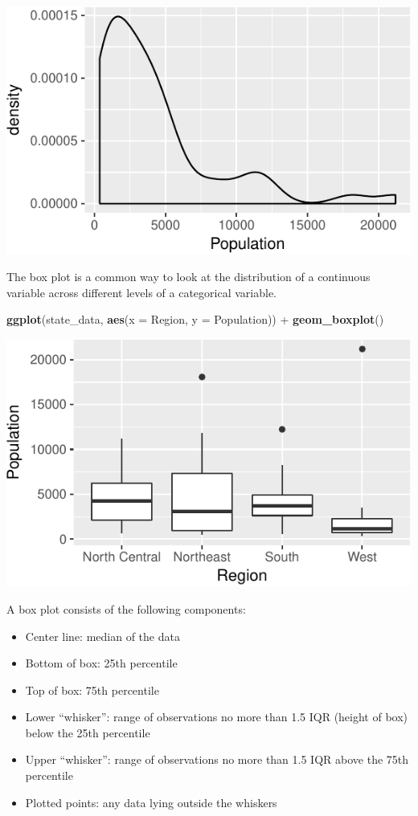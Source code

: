 \documentclass[12pt,oneside,openany]{book}
\newenvironment{Shaded}{\begin{snugshade}}{\end{snugshade}}
\newcommand{\KeywordTok}[1]{\textcolor[rgb]{0.13,0.29,0.53}{\textbf{{#1}}}}
\newcommand{\DataTypeTok}[1]{\textcolor[rgb]{0.13,0.29,0.53}{{#1}}}
\newcommand{\StringTok}[1]{\textcolor[rgb]{0.31,0.60,0.02}{{#1}}}
\newcommand{\NormalTok}[1]{{#1}}
\providecommand{\tightlist}{%
  \setlength{\itemsep}{0pt}\setlength{\parskip}{0pt}}
\begin{document}
\includegraphics{pdaps_files/figure-latex/density-1.pdf}

The box plot is a common way to look at the distribution of a continuous
variable across different levels of a categorical variable.

\begin{Shaded}
\begin{Highlighting}[]
\KeywordTok{ggplot}\NormalTok{(state_data, }\KeywordTok{aes}\NormalTok{(}\DataTypeTok{x =} \NormalTok{Region, }\DataTypeTok{y =} \NormalTok{Population)) +}
\StringTok{  }\KeywordTok{geom_boxplot}\NormalTok{()}
\end{Highlighting}
\end{Shaded}

\includegraphics{pdaps_files/figure-latex/boxplot-1.pdf}

A box plot consists of the following components:

\begin{itemize}
\tightlist
\item
  Center line: median of the data
\item
  Bottom of box: 25th percentile
\item
  Top of box: 75th percentile
\item
  Lower ``whisker'': range of observations no more than 1.5 IQR (height
  of box) below the 25th percentile
\item
  Upper ``whisker'': range of observations no more than 1.5 IQR above
  the 75th percentile
\item
  Plotted points: any data lying outside the whiskers
\end{itemize}
\end{document}
